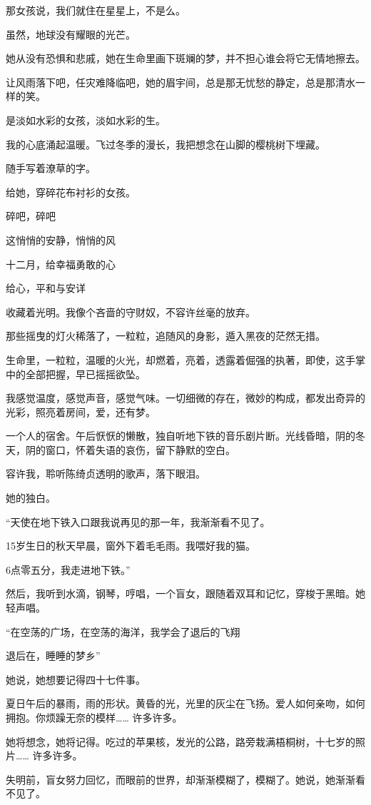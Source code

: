 \documentclass[12pt,a4paper]{article}
\def\blankrev{\vspace{1ex}}									%
\begin{document}
		那女孩说，我们就住在星星上，不是么。

		虽然，地球没有耀眼的光芒。


		\blankrev
		她从没有恐惧和悲戚，她在生命里画下斑斓的梦，并不担心谁会将它无情地擦去。

		让风雨落下吧，任灾难降临吧，她的眉宇间，总是那无忧愁的静定，总是那清水一样的笑。

		是淡如水彩的女孩，淡如水彩的生。


		\blankrev
		我的心底涌起温暖。飞过冬季的漫长，我把想念在山脚的樱桃树下埋藏。

		随手写着潦草的字。

		给她，穿碎花布衬衫的女孩。


		\blankrev
		碎吧，碎吧

		这悄悄的安静，悄悄的风

		十二月，给幸福勇敢的心

		给心，平和与安详

	\endwriting



		收藏着光明。我像个吝啬的守财奴，不容许丝毫的放弃。


		那些摇曳的灯火稀落了，一粒粒，追随风的身影，遁入黑夜的茫然无措。\par
		生命里，一粒粒，温暖的火光，却燃着，亮着，透露着倔强的执著，即使，这手掌中的全部把握，早已摇摇欲坠。

		我感觉温度，感觉声音，感觉气味。一切细微的存在，微妙的构成，都发出奇异的光彩，照亮着房间，爱，还有梦。\par
		一个人的宿舍。午后恹恹的懒散，独自听地下铁的音乐剧片断。光线昏暗，阴的冬天，阴的窗口，怀着失语的哀伤，留下静默的空白。\par
		容许我，聆听陈绮贞透明的歌声，落下眼泪。

		她的独白。

		“天使在地下铁入口跟我说再见的那一年，我渐渐看不见了。\par
		15岁生日的秋天早晨，窗外下着毛毛雨。我喂好我的猫。\par
		6点零五分，我走进地下铁。”

		然后，我听到水滴，钢琴，哼唱，一个盲女，跟随着双耳和记忆，穿梭于黑暗。她轻声唱。

		“在空荡的广场，在空荡的海洋，我学会了退后的飞翔\par
		退后在，睡睡的梦乡”

		她说，她想要记得四十七件事。\par
		夏日午后的暴雨，雨的形状。黄昏的光，光里的灰尘在飞扬。爱人如何亲吻，如何拥抱。你烦躁无奈的模样…… 许多许多。\par
		她将想念，她将记得。吃过的苹果核，发光的公路，路旁栽满梧桐树，十七岁的照片…… 许多许多。\par
		失明前，盲女努力回忆，而眼前的世界，却渐渐模糊了，模糊了。她说，她渐渐看不见了。
\end{document}

